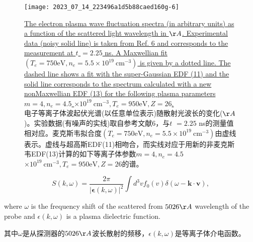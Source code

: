 \documentclass[oneside,onecolumn]{article}
\newcommand\enzhbox[2]{
	\quad\par \begin{paracol}{2} 
			\begin{spacing}{1.0}
					\footnotesize  #1
			\end{spacing}
			
		\switchcolumn[1] 
		#2
	\end{paracol} 
}
\begin{document}
\begin{sloppypar}
  \begin{figure}[tbp]
  	\centering
  	\texttt{[image: 2023\_07\_14\_223496a1d5b88caed160g-6]}
  	\caption{\uline{The electron plasma wave fluctuation spectra (in arbitrary units) as a function of the scattered light wavelength in $\AA$. Experimental data (noisy solid line) is taken from Ref. 6 and corresponds to the measurement at $t$ $=2.25$ ns. A Maxwellian fit $\left(T_{e}=750 \mathrm{eV}, n_{e}=5.5 \times 10^{19} \mathrm{~cm}^{-3}\right)$ is given by a dotted line. The dashed line shows a fit with the super-Gaussian EDF (11) and the solid line corresponds to the spectrum calculated with a new nonMaxwellian EDF (13) for the following plasma parameters $m=4, n_{e}=4.5$ $\times 10^{19} \mathrm{~cm}^{-3}, T_{e}=950 \mathrm{eV}, Z=26$.}\\电子等离子体波起伏光谱(以任意单位表示)随散射光波长的变化($\AA$)。实验数据(有噪声的实线)取自参考文献6，与$t$ $=2.25$ ns的测量值相对应。麦克斯韦拟合度$\left(T_{e}=750 \mathrm{eV}, n_{e}=5.5 \times 10^{19} \mathrm{~cm}^{-3}\right)$由虚线表示。虚线与超高斯EDF(11)相吻合，而实线对应于用新的非麦克斯韦EDF(13)计算的如下等离子体参数$m=4, n_{e}=4.5$ $\times 10^{19} \mathrm{~cm}^{-3}, T_{e}=950 \mathrm{eV}, Z=26$的谱。}
  	\label{figure6}
  \end{figure}
  
  
  \begin{equation}
  S(k, \omega)=\frac{2 \pi}{|\boldsymbol{\epsilon}(k, \omega)|^{2}} \int d^{3} v f_{0}(v) \delta(\omega-\mathbf{k} \cdot \mathbf{v}),
  \end{equation}
  

\enzhbox{  where $\omega$ is the frequency shift of the scattered from $5026 \AA$ wavelength of the probe and $\epsilon(k, \omega)$ is a plasma dielectric function.
}{
其中$\omega$是从探测器的$5026 \AA$波长散射的频移，$\epsilon(k, \omega)$是等离子体介电函数。
}



\end{sloppypar}
\end{document}
